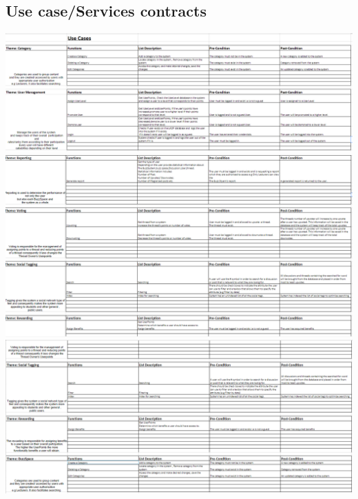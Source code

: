 \documentclass[a4paper,12pt]{report}
\begin{document}
\subsection{Use case/Services contracts}
\includegraphics[width=1\textwidth]{./Use_case_A.png}\\[0.4cm]
\includegraphics[width=1\textwidth]{./Use_case_B.png}\\[0.4cm] 
\includegraphics[width=1\textwidth]{./Use_case_C.png}\\[0.4cm]

\newpage
\end{document}

